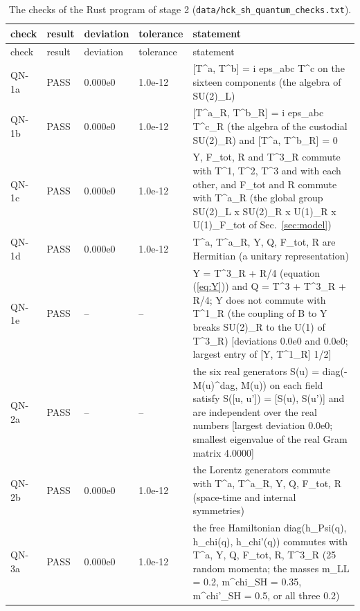 \documentclass[aps,prd,onecolumn,superscriptaddress,nofootinbib,floatfix,longbibliography]{revtex4-2}
\begin{document}
\begingroup\fontsize{7}{8.5}\selectfont\setlength{\tabcolsep}{3pt}
\begin{longtable}{p{}p{}p{}p{}p{}}
\caption{\label{tab:checks_quantum_rust}The checks of the Rust program of stage 2 (\texttt{data/hck\_sh\_quantum\_checks.txt}).}\\
\hline\hline
check & result & deviation & tolerance & statement \\ \hline
\endfirsthead
\hline check & result & deviation & tolerance & statement \\ \hline
\endhead
\hline\hline
\endlastfoot
QN-1a & PASS & 0.000e0 & 1.0e-12 & [T\textasciicircum{}a, T\textasciicircum{}b] = i eps\_abc T\textasciicircum{}c on the sixteen components (the algebra of SU(2)\_L) \\
QN-1b & PASS & 0.000e0 & 1.0e-12 & [T\textasciicircum{}a\_R, T\textasciicircum{}b\_R] = i eps\_abc T\textasciicircum{}c\_R (the algebra of the custodial SU(2)\_R) and [T\textasciicircum{}a, T\textasciicircum{}b\_R] = 0 \\
QN-1c & PASS & 0.000e0 & 1.0e-12 & Y, F\_tot, R and T\textasciicircum{}3\_R commute with T\textasciicircum{}1, T\textasciicircum{}2, T\textasciicircum{}3 and with each other, and F\_tot and R commute with T\textasciicircum{}a\_R (the global group SU(2)\_L x SU(2)\_R x U(1)\_R x U(1)\_F\_tot of Sec.~\ref{sec:model}) \\
QN-1d & PASS & 0.000e0 & 1.0e-12 & T\textasciicircum{}a, T\textasciicircum{}a\_R, Y, Q, F\_tot, R are Hermitian (a unitary representation) \\
QN-1e & PASS & -- & -- & Y = T\textasciicircum{}3\_R + R/4 (equation (\ref{eq:Y})) and Q = T\textasciicircum{}3 + T\textasciicircum{}3\_R + R/4; Y does not commute with T\textasciicircum{}1\_R (the coupling of B to Y breaks SU(2)\_R to the U(1) of T\textasciicircum{}3\_R) [deviations 0.0e0 and 0.0e0; largest entry of [Y, T\textasciicircum{}1\_R] 1/2] \\
QN-2a & PASS & -- & -- & the six real generators S(u) = diag(-M(u)\textasciicircum{}dag, M(u)) on each field satisfy S([u, u']) = [S(u), S(u')] and are independent over the real numbers [largest deviation 0.0e0; smallest eigenvalue of the real Gram matrix 4.0000] \\
QN-2b & PASS & 0.000e0 & 1.0e-12 & the Lorentz generators commute with T\textasciicircum{}a, T\textasciicircum{}a\_R, Y, Q, F\_tot, R (space-time and internal symmetries) \\
QN-3a & PASS & 0.000e0 & 1.0e-12 & the free Hamiltonian diag(h\_Psi(q), h\_chi(q), h\_chi'(q)) commutes with T\textasciicircum{}a, Y, Q, F\_tot, R, T\textasciicircum{}3\_R (25 random momenta; the masses m\_LL = 0.2, m\textasciicircum{}chi\_SH = 0.35, m\textasciicircum{}chi'\_SH = 0.5, or all three 0.2) \\

\end{longtable}
\end{document}
